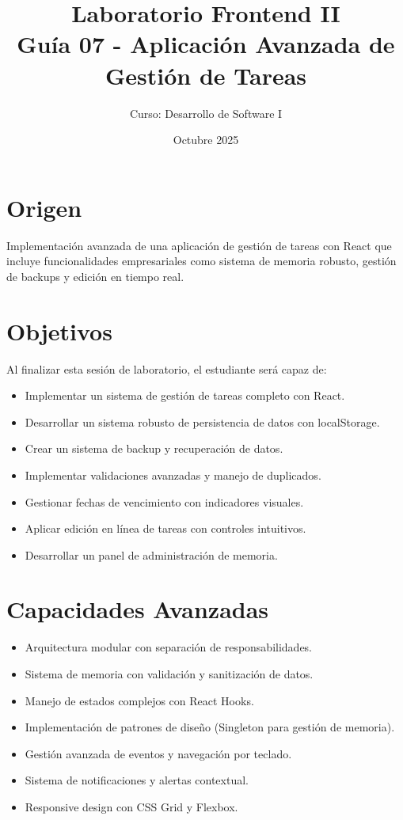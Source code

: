 \documentclass[12pt,a4paper]{article}
\title{\vspace{-2em}Laboratorio Frontend II\\\large Guía 07 - Aplicación Avanzada de Gestión de Tareas}
\author{Curso: Desarrollo de Software I}
\date{Octubre 2025}
\begin{document}
\maketitle

\section*{Origen}
Implementación avanzada de una aplicación de gestión de tareas con React que incluye funcionalidades empresariales como sistema de memoria robusto, gestión de backups y edición en tiempo real.

\section{Objetivos}
Al finalizar esta sesión de laboratorio, el estudiante será capaz de:
\begin{itemize}
  \item Implementar un sistema de gestión de tareas completo con React.
  \item Desarrollar un sistema robusto de persistencia de datos con localStorage.
  \item Crear un sistema de backup y recuperación de datos.
  \item Implementar validaciones avanzadas y manejo de duplicados.
  \item Gestionar fechas de vencimiento con indicadores visuales.
  \item Aplicar edición en línea de tareas con controles intuitivos.
  \item Desarrollar un panel de administración de memoria.
\end{itemize}

\section{Capacidades Avanzadas}
\begin{itemize}
  \item Arquitectura modular con separación de responsabilidades.
  \item Sistema de memoria con validación y sanitización de datos.
  \item Manejo de estados complejos con React Hooks.
  \item Implementación de patrones de diseño (Singleton para gestión de memoria).
  \item Gestión avanzada de eventos y navegación por teclado.
  \item Sistema de notificaciones y alertas contextual.
  \item Responsive design con CSS Grid y Flexbox.
\end{itemize}
\end{document}
